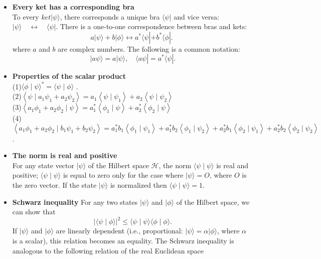 \begin{itemize}
	\item \textbf{ Every ket has a corresponding bra}\\
	To every $k e t|\psi\rangle$, there corresponds a unique bra $\langle\psi|$ and vice versa:
	$|\psi\rangle \quad \longleftrightarrow \quad\langle\psi|$.
	There is a one-to-one correspondence between bras and kets:
	$$
	a|\psi\rangle+b|\phi\rangle \longleftrightarrow a^{*}\langle\psi|+b^{*}\langle\phi| \text {. }
	$$
	where $a$ and $b$ are complex numbers. The following is a common notation:
	$$
	|a \psi\rangle=a|\psi\rangle, \quad\langle a \psi|=a^{*}\langle\psi| .
	$$
	\item \textbf{Properties of the scalar product}\\
	(1)$\langle\phi \mid \psi\rangle^{*}=\langle\psi \mid \phi\rangle $ .\\
	(2)$\left\langle\psi \mid a_{1} \psi_{1}+a_{2} \psi_{2}\right\rangle= a_{1}\left\langle\psi \mid \psi_{1}\right\rangle+a_{2}\left\langle\psi \mid \psi_{2}\right\rangle $\\
	(3)$\left\langle a_{1} \phi_{1}+a_{2} \phi_{2} \mid \psi\right\rangle= a_{1}^{*}\left\langle\phi_{1} \mid \psi\right\rangle+a_{2}^{*}\left\langle\phi_{2} \mid \psi\right\rangle $\\
		(4)$\left\langle a_{1} \phi_{1}+a_{2} \phi_{2} \mid b_{1} \psi_{1}+b_{2} \psi_{2}\right\rangle= a_{1}^{*} b_{1}\left\langle\phi_{1} \mid \psi_{1}\right\rangle+a_{1}^{*} b_{2}\left\langle\phi_{1} \mid \psi_{2}\right\rangle 
		+a_{2}^{*} b_{1}\left\langle\phi_{2} \mid \psi_{1}\right\rangle+a_{2}^{*} b_{2}\left\langle\phi_{2} \mid \psi_{2}\right\rangle$ .
\item \textbf{ The norm is real and positive}\\
For any state vector $|\psi\rangle$ of the Hilbert space $\mathcal{H}$, the norm $\langle\psi \mid \psi\rangle$ is real and positive; $\langle\psi \mid \psi\rangle$ is equal to zero only for the case where $|\psi\rangle=O$, where $O$ is the zero vector. If the state $|\psi\rangle$ is normalized then $\langle\psi \mid \psi\rangle=1$.
\item \textbf{Schwarz inequality}
For any two states $|\psi\rangle$ and $|\phi\rangle$ of the Hilbert space, we can show that
$$
|\langle\psi \mid \phi\rangle|^{2} \leq\langle\psi \mid \psi\rangle\langle\phi \mid \phi\rangle .
$$
If $|\psi\rangle$ and $|\phi\rangle$ are linearly dependent (i.e., proportional: $|\psi\rangle=\alpha|\phi\rangle$, where $\alpha$ is a scalar), this relation becomes an equality. The Schwarz inequality  is analogous to the following relation of the real Euclidean space

\end{itemize}
